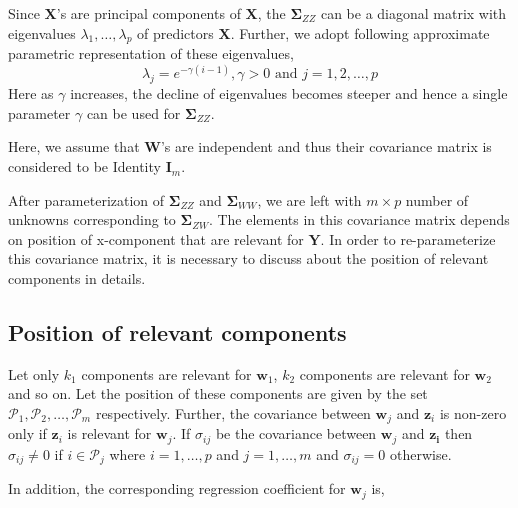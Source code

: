 \documentclass[12pt,A4paper,authoryear]{elsarticle} %
\providecommand{\tightlist}{%
  \setlength{\itemsep}{0pt}\setlength{\parskip}{0pt}}
\begin{document}
\begin{description}
\tightlist
\item[\textbf{Parameterization of \(\boldsymbol{\Sigma}_{ZZ}\):}]
Since \(\mathbf{X}\)'s are principal components of \(\mathbf{X}\), the
\(\boldsymbol{\Sigma}_{ZZ}\) can be a diagonal matrix with eigenvalues
\(\lambda_1, \ldots, \lambda_p\) of predictors \(\mathbf{X}\). Further,
we adopt following approximate parametric representation of these
eigenvalues,
\[\lambda_j = e^{-\gamma(i - 1)}, \gamma >0 \text{ and } j = 1, 2, \ldots, p\]
Here as \(\gamma\) increases, the decline of eigenvalues becomes steeper
and hence a single parameter \(\gamma\) can be used for
\(\boldsymbol{\Sigma}_{ZZ}\).
\item[\textbf{Parameterization of \(\boldsymbol{\Sigma}_{WW}\):}]
Here, we assume that \(\mathbf{W}\)'s are independent and thus their
covariance matrix is considered to be Identity \(\mathbf{I}_m\).
\item[\textbf{Parameterization of \(\boldsymbol{\Sigma}_{ZW}\):}]
After parameterization of \(\boldsymbol{\Sigma}_{ZZ}\) and
\(\boldsymbol{\Sigma}_{WW}\), we are left with \(m \times p\) number of
unknowns corresponding to \(\boldsymbol{\Sigma}_{ZW}\). The elements in
this covariance matrix depends on position of x-component that are
relevant for \(\mathbf{Y}\). In order to re-parameterize this covariance
matrix, it is necessary to discuss about the position of relevant
components in details.
\end{description}

\subsection{Position of relevant
components}\label{position-of-relevant-components}

Let only \(k_1\) components are relevant for \(\mathbf{w}_1\), \(k_2\)
components are relevant for \(\mathbf{w}_2\) and so on. Let the position
of these components are given by the set
\(\mathcal{P}_1, \mathcal{P}_2, \ldots, \mathcal{P}_m\) respectively.
Further, the covariance between \(\mathbf{w}_j\) and \(\mathbf{z}_i\) is
non-zero only if \(\mathbf{z}_i\) is relevant for \(\mathbf{w}_j\). If
\(\sigma_{ij}\) be the covariance between \(\mathbf{w}_j\) and
\(\mathbf{z_i}\) then \(\sigma_{ij} \ne 0\) if \(i \in \mathcal{P}_j\)
where \(i = 1, \ldots, p\) and \(j = 1, \ldots, m\) and
\(\sigma_{ij} = 0\) otherwise.

In addition, the corresponding regression coefficient for
\(\mathbf{w}_j\) is,
\end{document}
